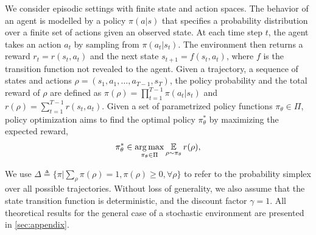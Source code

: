 We consider episodic
settings with finite state and action spaces. 
The behavior of an agent is modelled by a policy $\pi(a|s)$
that specifies a probability distribution over a finite set of actions
given an observed state. 
At each time step $t$, the agent takes an action $a_t$ by sampling from
$\pi(a_t | s_t)$.
The environment then returns a reward $r_t = r(s_t, a_t)$ and the next state
$s_{t+1} = f(s_t, a_t)$,
where $f$ is the transition function not revealed to the agent.
Given a trajectory, a sequence of states and actions
$\rho=(s_1, a_1, \dots, a_{T-1}, s_T)$,
the policy probability and the total reward of $\rho$ are defined as
$\pi(\rho) = \prod_{t=1}^{T-1} \pi(a_t| s_t)$
 and $r(\rho) = \sum_{t=1}^{T-1} r(s_t, a_t)$. 
Given a set of parametrized policy functions $\pi_\theta \in \Pi$,
policy optimization aims to find the optimal policy $\pi_\theta^*$
by maximizing the expected reward,
\begin{equation}
\label{max_expected_reward}
\begin{split}
\pi_\theta^* \in \operatorname*{arg\,max}_{\pi_\theta \in \Pi}{ \operatorname*{\mathbb{E}}\limits_{\rho \sim \pi_\theta}{r(\rho)} },
\end{split}
\end{equation}

We use
$\Delta \triangleq \{ \pi | \sum_{\rho}{\pi(\rho)} = 1, \pi(\rho) \ge 0,
\forall \rho \}$
to refer to the probability simplex over all possible trajectories. 
Without loss of generality, we also assume that the state transition function
is deterministic, and the discount factor $\gamma = 1$.
All theoretical results for the general case of a stochastic environment are presented
in \cref{sec:appendix}. %
